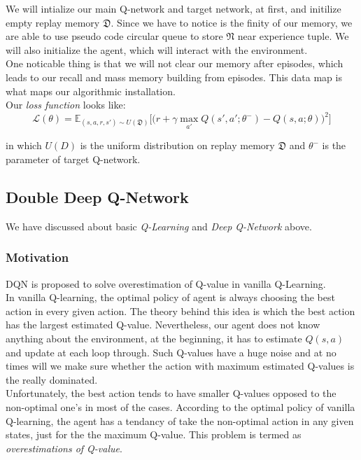 \documentclass{article}
\begin{document}
We will intialize our main Q-network and target network, at first, and initilize empty replay memory $\mathfrak{D}$. Since we have to notice is the finity of our memory, we are able to use pseudo code circular queue to store $\mathfrak{N}$ near experience tuple. We will also initialize the agent, which will interact with the environment.\\

One noticable thing is that we will not clear our memory after episodes, which leads to our recall and mass memory building from episodes. This data map is what maps our algorithmic installation.\\

Our \textit{loss function} looks like:
\begin{equation}
    \mathcal{L}\left(\theta\right) = \mathbb{E}_{(s, a, r, s') \sim U(\mathfrak{D})} \Big[ \big( r + \gamma \max_{a'} Q(s', a'; \theta^{-}) - Q(s, a; \theta) \big)^2 \Big]
\end{equation}

in which $U(D)$ is the uniform distribution on replay memory $\mathfrak{D}$ and $\theta^{-}$ is the parameter of target Q-network.\\

\subsection*{Double Deep Q-Network}
We have discussed about basic \textit{Q-Learning} and \textit{Deep Q-Network} above. 
\subsubsection*{Motivation}
DQN is proposed to solve overestimation of Q-value in vanilla Q-Learning.\\

In vanilla Q-learning, the optimal policy of agent is always choosing the best action in every given action. The theory behind this idea is which the best action has the largest estimated Q-value. Nevertheless, our agent does not know anything about the environment, at the beginning, it has to estimate $Q(s, a)$ and update at each loop through. Such Q-values have a huge noise and at no times will we make sure whether the action with maximum estimated Q-values is the really dominated.\\

Unfortunately, the best action tends to have smaller Q-values opposed to the non-optimal one's in most of the cases. According to the optimal policy of vanilla Q-learning, the agent has a tendancy of take the non-optimal action in any given states, just for the the maximum Q-value. This problem is termed as \textit{overestimations of Q-value}.\\
\end{document}
